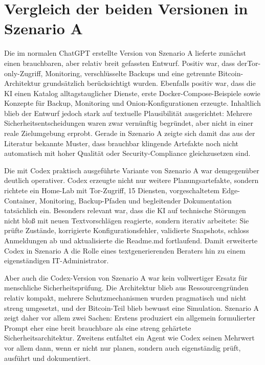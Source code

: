\section{Vergleich der beiden Versionen in Szenario A}

Die im normalen ChatGPT erstellte Version von Szenario A lieferte zunächst einen brauchbaren, aber relativ breit gefassten Entwurf. Positiv war, dass derTor-only-Zugriff, Monitoring, verschlüsselte Backups und eine getrennte Bitcoin-Architektur grundsätzlich berücksichtigt wurden. Ebenfalls positiv war, dass die \acs{KI} einen Katalog alltagstauglicher Dienste, erste Docker-Compose-Beispiele sowie Konzepte für Backup, Monitoring und Onion-Konfigurationen erzeugte. Inhaltlich blieb der Entwurf jedoch stark auf textuelle Plausibilität ausgerichtet: Mehrere Sicherheitsentscheidungen waren zwar vernünftig begründet, aber nicht in einer reale Zielumgebung erprobt. Gerade in Szenario A zeigte sich damit das aus der Literatur bekannte Muster, dass brauchbar klingende Artefakte noch nicht automatisch mit hoher Qualität oder Security-Compliance gleichzusetzen sind.\cite{pan2025deployabilitycentriciac,hase2026securitypolicyiac}

Die mit Codex praktisch ausgeführte Variante von Szenario A war demgegenüber deutlich operativer. Codex erzeugte nicht nur weitere Planungsartefakte, sondern richtete ein Home-Lab mit Tor-Zugriff, 15 Diensten, vorgeschaltetem Edge-Container, Monitoring, Backup-Pfaden und begleitender Dokumentation tatsächlich ein. Besonders relevant war, dass die \acs{KI} auf technische Störungen nicht bloß mit neuen Textvorschlägen reagierte, sondern iterativ arbeitete: Sie prüfte Zustände, korrigierte Konfigurationsfehler, validierte Snapshots, schloss Anmeldungen ab und aktualisierte die Readme.md fortlaufend. Damit erweiterte  Codex in Szenario A die Rolle eines textgenerierenden Beraters hin zu einem eigenständigen IT-Administrator.

 Aber auch die Codex-Version von Szenario A war kein vollwertiger Ersatz für menschliche Sicherheitsprüfung. Die Architektur blieb aus Ressourcengründen relativ kompakt, mehrere Schutzmechanismen wurden pragmatisch und nicht streng umgesetzt, und der Bitcoin-Teil blieb bewusst eine Simulation. Szenario A zeigt daher vor allem zwei Sachen: Erstens produziert ein allgemein formulierter Prompt eher eine breit brauchbare als eine streng gehärtete Sicherheitsarchitektur. Zweitens entfaltet ein Agent wie Codex seinen Mehrwert vor allem dann, wenn er nicht nur planen, sondern auch eigenständig prüft, ausführt und dokumentiert.

